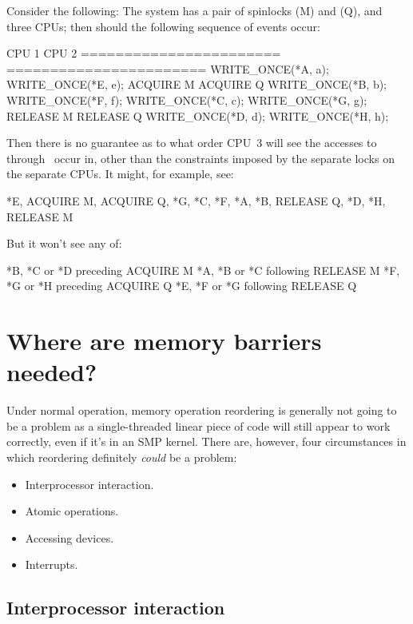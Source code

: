 Consider the following:
The system has a pair of spinlocks (M) and (Q), and three CPUs; then
should the following sequence of events occur:

\begin{VerbatimU}
	CPU 1                   CPU 2
	======================= =======================
	WRITE_ONCE(*A, a);      WRITE_ONCE(*E, e);
	ACQUIRE M               ACQUIRE Q
	WRITE_ONCE(*B, b);      WRITE_ONCE(*F, f);
	WRITE_ONCE(*C, c);      WRITE_ONCE(*G, g);
	RELEASE M               RELEASE Q
	WRITE_ONCE(*D, d);      WRITE_ONCE(*H, h);
\end{VerbatimU}

Then there is no guarantee as to what order CPU~3 will see the accesses
to~ through~ occur in, other than the constraints imposed by
the separate locks on the separate CPUs.
It might, for example, see:

\begin{VerbatimU}[tabsize=1]
	*E, ACQUIRE M, ACQUIRE Q, *G, *C, *F, *A, *B, RELEASE Q, *D, *H, RELEASE M
\end{VerbatimU}

But it won't see any of:

\begin{VerbatimU}
	*B, *C or *D preceding ACQUIRE M
	*A, *B or *C following RELEASE M
	*F, *G or *H preceding ACQUIRE Q
	*E, *F or *G following RELEASE Q
\end{VerbatimU}


\section{Where are memory barriers needed?}

Under normal operation, memory operation reordering is generally not going to
be a problem as a single-threaded linear piece of code will still appear to
work correctly, even if it's in an SMP kernel.
There are, however, four circumstances in which reordering definitely
\emph{could} be a problem:

\begin{itemize}
 \item Interprocessor interaction.
 \item Atomic operations.
 \item Accessing devices.
 \item Interrupts.
\end{itemize}

\subsection{Interprocessor interaction}

